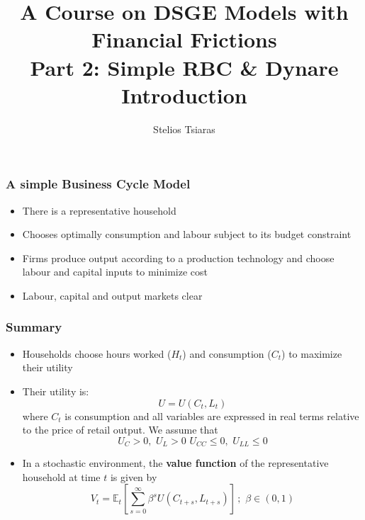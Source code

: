 \documentclass[xcolor=dvipsnames,handout,aspectratio=169]{beamer}
\title[\today]{\textbf{A Course on DSGE Models with Financial Frictions\\ Part 2: Simple RBC \& Dynare Introduction}}
\author{Stelios Tsiaras}
\institute{European University Institute}
\begin{document}
\begin{frame}[noframenumbering]
\titlepage 
\end{frame}

\begin{frame}[c]\frametitle {\textbf{A simple Business Cycle Model}} 
\begin{itemize}
    \setlength\itemsep{2em}
    \item There is a representative household
    \item Chooses optimally consumption and labour subject to its budget constraint
    \item Firms produce output according to a production technology and choose labour and capital inputs to minimize cost
    \item Labour, capital and output markets clear
\end{itemize}
\end{frame}

\begin{frame}[c]\frametitle {\textbf{Summary}} 
\begin{itemize}
    \setlength\itemsep{2em}
\item Households choose hours worked ($H_t$)  and consumption ($C_t$) to maximize their utility
\item Their utility is:
\begin{equation*}\label{Hutil}
U=U(C_t, L_t)
\end{equation*}
where $C_t$ is consumption and all variables are expressed in real terms relative to the price of retail output. We assume that
\begin{equation}\label{Hutilconds}
U_C>0,\,\, U_L>0\,\, U_{CC} \le 0,\,\, U_{LL} \le 0
\end{equation}
\item In a stochastic environment, the \textbf{value function} of the representative household at time $t$ is given by
\begin{equation}\label{HVF}
 V_t=\mathbb{E}_t \left[\sum_{s=0}^\infty \beta^s U(C_{t+s}, L_{t+s})\right]\,; \,\,\beta \in (0,1)
\end{equation}
\end{itemize}
\end{frame}
\end{document}

